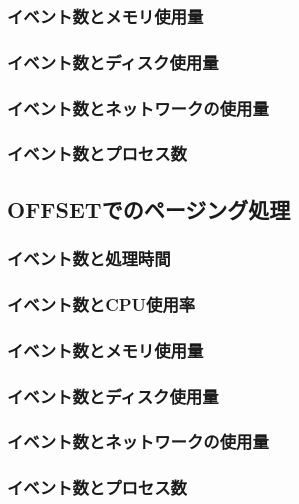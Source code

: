 \documentclass[../../main]{subfiles}
\begin{document}
    \subsubsection{イベント数とメモリ使用量}\label{subsubsec:result-chunk-memory}
    \subsubsection{イベント数とディスク使用量}\label{subsubsec:result-chunk-disk}
    \subsubsection{イベント数とネットワークの使用量}\label{subsubsec:result-chunk-network}
    \subsubsection{イベント数とプロセス数}\label{subsubsec:result-chunk-process}

    \subsection{OFFSETでのページング処理}\label{subsec:result-paging-offset}
    \subsubsection{イベント数と処理時間}\label{subsubsec:result-paging-offset-time}
    \subsubsection{イベント数とCPU使用率}\label{subsubsec:result-paging-offset-cpu}
    \subsubsection{イベント数とメモリ使用量}\label{subsubsec:result-paging-offset-memory}
    \subsubsection{イベント数とディスク使用量}\label{subsubsec:result-paging-offset-disk}
    \subsubsection{イベント数とネットワークの使用量}\label{subsubsec:result-paging-offset-network}
    \subsubsection{イベント数とプロセス数}\label{subsubsec:result-paging-offset-process}
\end{document}
